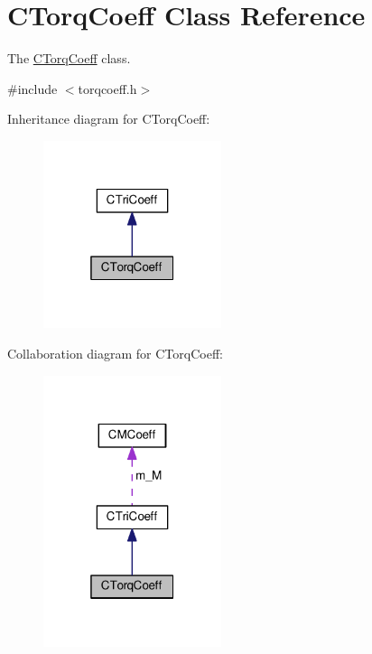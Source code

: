 \hypertarget{classCTorqCoeff}{\section{C\-Torq\-Coeff Class Reference}
\label{classCTorqCoeff}
}


The \hyperlink{classCTorqCoeff}{C\-Torq\-Coeff} class.  




{\ttfamily \#include $<$torqcoeff.\-h$>$}



Inheritance diagram for C\-Torq\-Coeff\-:\nopagebreak
\begin{figure}[H]
\begin{center}
\leavevmode
\includegraphics[width=148pt]{classCTorqCoeff__inherit__graph}
\end{center}
\end{figure}


Collaboration diagram for C\-Torq\-Coeff\-:\nopagebreak
\begin{figure}[H]
\begin{center}
\leavevmode
\includegraphics[width=148pt]{classCTorqCoeff__coll__graph}
\end{center}
\end{figure}
